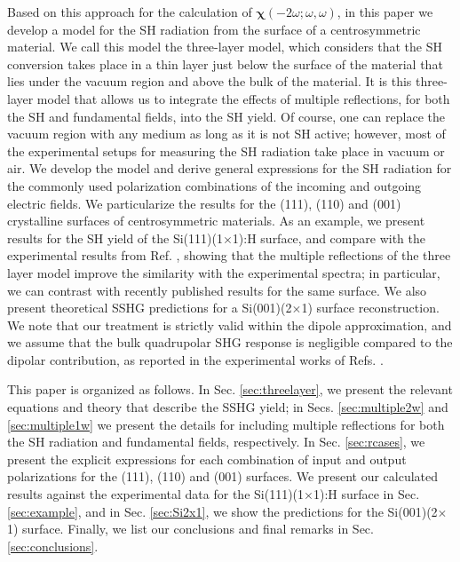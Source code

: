 \documentclass[aps,prb,10pt,showpacs,letterpaper,twocolumn]{revtex4-1}
\begin{document}
Based on this approach for the calculation of
$\boldsymbol{\chi}(-2\omega;\omega,\omega)$, in this paper we develop a model
for the SH radiation from the surface of a centrosymmetric material. We call
this model the three-layer model, which considers that the SH conversion takes
place in a thin layer just below the surface of the material that lies under the
vacuum region and above the bulk of the material. It is this three-layer model
that allows us to integrate the effects of multiple reflections, for both the SH
and fundamental fields, into the SH yield. Of course, one can replace the vacuum
region with any medium as long as it is not SH active; however, most of the
experimental setups for measuring the SH radiation take place in vacuum or air.
We develop the model and derive general expressions for the SH radiation for the
commonly used polarization combinations of the incoming and outgoing electric
fields. We particularize the results for the (111), (110) and (001) crystalline
surfaces of centrosymmetric materials. As an example, we present results for the
SH yield of the Si(111)(1$\times$1):H surface, and compare with the experimental
results from Ref. , showing that the multiple reflections
of the three layer model improve the similarity with the experimental spectra;
in particular, we can contrast with recently published results for the same
surface.\cite{andersonPRB16} We also present theoretical SSHG predictions for a
Si(001)(2$\times$1) surface reconstruction. We note that our treatment is
strictly valid within the dipole approximation, and we assume that the bulk
quadrupolar SHG response is negligible compared to the dipolar contribution, as
reported in the experimental works of Refs. .
 
This paper is organized as follows. In Sec. \ref{sec:threelayer}, we present the
relevant equations and theory that describe the SSHG yield; in Secs.
\ref{sec:multiple2w} and \ref{sec:multiple1w} we present the details for
including multiple reflections for both the SH radiation and fundamental fields,
respectively. In Sec. \ref{sec:rcases}, we present the explicit expressions for
each combination of input and output polarizations for the (111), (110) and
(001) surfaces. We present our calculated results against the experimental data
for the Si(111)(1$\times$1):H surface in Sec. \ref{sec:example}, and in Sec.
\ref{sec:Si2x1}, we show the predictions for the Si(001)(2$\times$1) surface.
Finally, we list our conclusions and final remarks in Sec.
\ref{sec:conclusions}.
\end{document}
